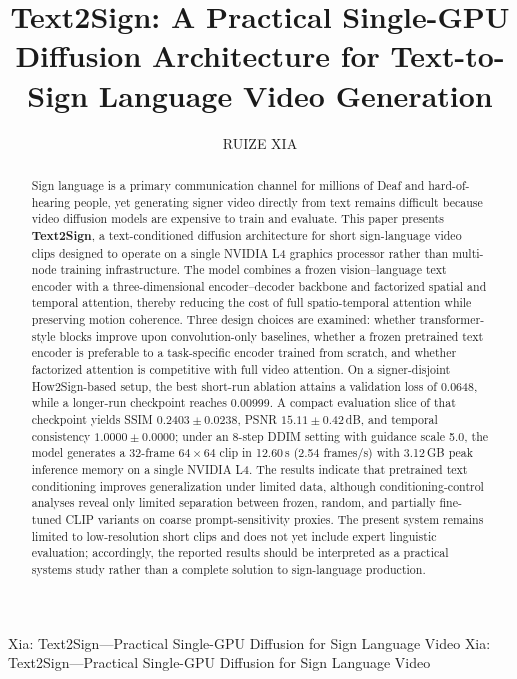 \documentclass{ieeeaccess}
\begin{document}

\title{{\color{blue}Text2Sign: A Practical Single-GPU Diffusion Architecture for Text-to-Sign Language Video Generation}}
\author{
\uppercase{Ruize Xia}
\address[]{Independent Researcher (e-mail: xiaruize0911@gmail.com)}
}


\markboth
{{\color{blue}Xia: Text2Sign---Practical Single-GPU Diffusion for Sign Language Video}}
{{\color{blue}Xia: Text2Sign---Practical Single-GPU Diffusion for Sign Language Video}}

\begin{abstract}
\begingroup\color{blue}
Sign language is a primary communication channel for millions of Deaf and hard-of-hearing people, yet generating signer video directly from text remains difficult because video diffusion models are expensive to train and evaluate. This paper presents \textbf{Text2Sign}, a text-conditioned diffusion architecture for short sign-language video clips designed to operate on a single NVIDIA L4 graphics processor rather than multi-node training infrastructure. The model combines a frozen vision--language text encoder with a three-dimensional encoder--decoder backbone and factorized spatial and temporal attention, thereby reducing the cost of full spatio-temporal attention while preserving motion coherence. Three design choices are examined: whether transformer-style blocks improve upon convolution-only baselines, whether a frozen pretrained text encoder is preferable to a task-specific encoder trained from scratch, and whether factorized attention is competitive with full video attention. On a signer-disjoint How2Sign-based setup, the best short-run ablation attains a validation loss of 0.0648, while a longer-run checkpoint reaches 0.00999. A compact evaluation slice of that checkpoint yields SSIM $0.2403\pm0.0238$, PSNR $15.11\pm0.42$\,dB, and temporal consistency $1.0000\pm0.0000$; under an 8-step DDIM setting with guidance scale 5.0, the model generates a 32-frame $64\times64$ clip in 12.60\,s (2.54 frames/s) with 3.12\,GB peak inference memory on a single NVIDIA L4. The results indicate that pretrained text conditioning improves generalization under limited data, although conditioning-control analyses reveal only limited separation between frozen, random, and partially fine-tuned CLIP variants on coarse prompt-sensitivity proxies. The present system remains limited to low-resolution short clips and does not yet include expert linguistic evaluation; accordingly, the reported results should be interpreted as a practical systems study rather than a complete solution to sign-language production.
\endgroup
\end{abstract}
\end{document}
